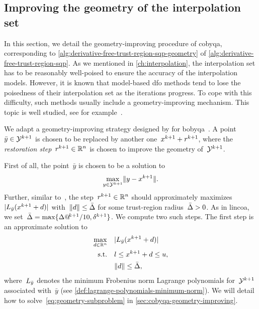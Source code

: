\subsection{Improving the geometry of the interpolation set}
\label{subsec:geometry-improvement}

In this section, we detail the geometry-improving procedure of \gls{cobyqa}, corresponding to \cref{alg:derivative-free-trust-region-sqp-geometry} of \cref{alg:derivative-free-trust-region-sqp}.
As we mentioned in \cref{ch:interpolation}, the interpolation set has to be reasonably well-poised to ensure the accuracy of the interpolation models.
However, it is known that model-based \gls{dfo} methods tend to lose the poisedness of their interpolation set as the iterations progress.
To cope with this difficulty, such methods usually include a geometry-improving mechanism.
This topic is well studied, see for example~\cite{Conn_Scheinberg_Vicente_2008a,Conn_Scheinberg_Vicente_2008b,Fasano_Morales_Nocedal_2009,Scheinberg_Toint_2010}.

We adapt a geometry-improving strategy designed by \citeauthor{Powell_2009} for \gls{bobyqa}~\cite{Powell_2009}.
A point~$\bar{y} \in \xpt[k + 1]$ is chosen to be replaced by another one~$\iter[k + 1] + \rstep[k + 1]$, where the \emph{restoration step}~$\rstep[k + 1] \in \R^n$ is chosen to improve the geometry of~$\xpt[k + 1]$.

First of all, the point~$\bar{y}$ is chosen to be a solution to
\begin{equation}
    \label{eq:choice-point-geometry-improving}
    \max_{y \in \xpt[k + 1]} \norm{y - \iter[k + 1]}.
\end{equation}
Further, similar to~\cite[Eq.~(6.6)]{Powell_2006}, the step~$\rstep[k + 1] \in \R^n$ should approximately maximizes~$\abs{\lagp[\bar{y}](\iter[k + 1] + \step)}$ with~$\norm{\step} \le \bar{\rad}$ for some trust-region radius~$\bar{\rad} > 0$.
As in \gls{lincoa}, we set~$\bar{\rad} = \max \set{\rad[k + 1] / 10, \radlb[k + 1]}$.
We compute two such steps.
The first step is an approximate solution to
\begin{subequations}
    \label{eq:geometry-subproblem}
    \begin{align}
        \max_{\step \in \R^n}   & \quad \abs{\lagp[\bar{y}](\iter[k + 1] + \step)}\\
        \text{s.t.}             & \quad \xl \le \iter[k + 1] + \step \le \xu,\\
                                & \quad \norm{\step} \le \bar{\rad},
    \end{align}
\end{subequations}
where~$\lagp[\bar{y}]$ denotes the minimum Frobenius norm Lagrange polynomials for~$\xpt[k + 1]$ associated with~$\bar{y}$ (see \cref{def:lagrange-polynomials-minimum-norm}).
We will detail how to solve~\cref{eq:geometry-subproblem} in \cref{sec:cobyqa-geometry-improving}.

